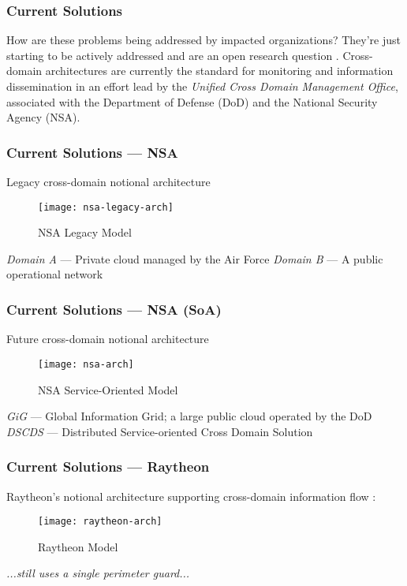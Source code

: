 \begin{frame}[t]
\frametitle{Current Solutions}
How are these problems being addressed by impacted organizations?
\newline
\newline
\pause
They're just starting to be actively addressed and are an open research question \cite{proposal:assured-info-sharing}.
\newline
\newline
Cross-domain architectures are currently the standard for monitoring and information dissemination in an effort lead by the \textit{Unified Cross Domain Management Office}, associated with the Department of Defense (DoD) and the National Security Agency (NSA).
\end{frame}

\begin{frame}[t]
\frametitle{Current Solutions --- NSA}
Legacy cross-domain notional architecture \cite{proposal:nsa-arch}
\begin{figure}[!t]
\centering
\texttt{[image: nsa-legacy-arch]}
\caption{NSA Legacy Model}
\label{fig:model:conceptual-model}
\end{figure}

\textit{Domain A} --- Private cloud managed by the Air Force
\newline
\textit{Domain B} --- A public operational network
\end{frame}

\begin{frame}[t]
\frametitle{Current Solutions --- NSA (SoA)}
Future cross-domain notional architecture \cite{proposal:nsa-arch}
\begin{figure}[!t]
\centering
\texttt{[image: nsa-arch]}
\caption{NSA Service-Oriented Model}
\label{fig:model:conceptual-model}
\end{figure}

\textit{GiG} --- Global Information Grid; a large public cloud operated by the DoD
\newline
\textit{DSCDS} --- Distributed Service-oriented Cross Domain Solution
\end{frame}

\begin{frame}[t]
\frametitle{Current Solutions --- Raytheon}
Raytheon's notional architecture supporting cross-domain information flow \cite{proposal:raytheon-arch}:
\begin{figure}[!t]
\centering
\texttt{[image: raytheon-arch]}
\caption{Raytheon Model}
\label{fig:model:conceptual-model}
\end{figure}

\textit{...still uses a single perimeter guard...}
\end{frame}

